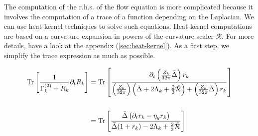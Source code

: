 The computation of the r.h.s. of the flow equation is more complicated because it involves the computation of a trace of a function depending on the Laplacian. We can use heat-kernel techniques to solve such equations. Heat-kernel computations are based on a curvature expansion in powers of the curvature scaler $\mathcal{R}$. For more details, have a look at the appendix (\ref{sec:heat-kernel}). As a first step, we simplify the trace expression as much as possible.

\begin{align}
\operatorname{Tr}\left[\frac{1}{\Gamma_{k}^{(2)} + R_k}\partial_t R_k\right] & = \operatorname{Tr}\left[\frac{\partial_t\left(\frac{Z_k}{32\pi}\bar{\Delta}\right)r_k}{\left(\frac{Z_k}{32\pi}\right)\left(\bar{\Delta} + 2\Lambda_k + \frac{2}{3}\bar{\mathcal{R}}\right) + \left(\frac{Z_k}{32\pi}\bar{\Delta}\right) r_k}\right]	\nonumber \\
\phantom{.} \\
&= \operatorname{Tr}\left[\frac{\bar{\Delta}\left(\partial_t r_k - \eta_g r_k\right)}{\bar{\Delta}(1+r_k)-2\Lambda_k+\frac{2}{3}\bar{\mathcal{R}}}\right] \nonumber
\end{align}

